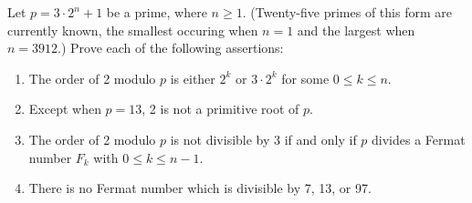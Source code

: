 \begin{exercise}
    Let $p = 3\cdot 2^n + 1$ be a prime, where $n \geq 1$. (Twenty-five primes of this form are currently known, the smallest occuring when $n = 1$ and the largest when $n = 3912$.) Prove each of the following assertions:
    \begin{enumerate}
        \item The order of 2 modulo $p$ is either $2^k$ or $3\cdot 2^k$ for some $0 \leq k \leq n$.
        \item Except when $p = 13$, 2 is not a primitive root of $p$. 
        \item The order of 2 modulo $p$ is not divisible by 3 if and only if $p$ divides a Fermat number $F_k$ with $0 \leq k \leq n-1$. 
        \item There is no Fermat number which is divisible by 7, 13, or 97. \\
    \end{enumerate}
\end{exercise}

